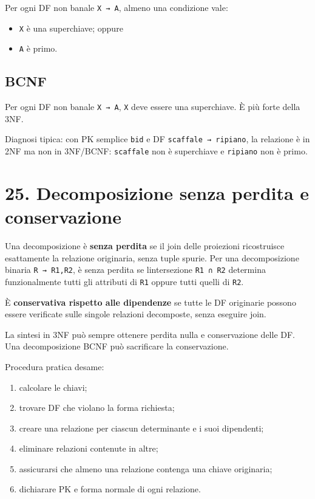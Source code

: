 \documentclass[
  10pt,
  a4paper,
]{article}
\providecommand{\tightlist}{%
  \setlength{\itemsep}{0pt}\setlength{\parskip}{0pt}}
\begin{document}
Per ogni DF non banale \texttt{X\ →\ A}, almeno una condizione vale:

\begin{itemize}
\tightlist
\item
  \texttt{X} è una superchiave; oppure
\item
  \texttt{A} è primo.
\end{itemize}

\subsection{BCNF}\label{bcnf}

Per ogni DF non banale \texttt{X\ →\ A}, \texttt{X} deve essere una
superchiave. È più forte della 3NF.

Diagnosi tipica: con PK semplice \texttt{bid} e DF
\texttt{scaffale\ →\ ripiano}, la relazione è in 2NF ma non in 3NF/BCNF:
\texttt{scaffale} non è superchiave e \texttt{ripiano} non è primo.

\section{25. Decomposizione senza perdita e
conservazione}\label{25-decomposizione-senza-perdita-e-conservazione}

Una decomposizione è \textbf{senza perdita} se il join delle proiezioni
ricostruisce esattamente la relazione originaria, senza tuple spurie.
Per una decomposizione binaria \texttt{R\ →\ R1,R2}, è senza perdita se
l\textquotesingle intersezione \texttt{R1\ ∩\ R2} determina
funzionalmente tutti gli attributi di \texttt{R1} oppure tutti quelli di
\texttt{R2}.

È \textbf{conservativa rispetto alle dipendenze} se tutte le DF
originarie possono essere verificate sulle singole relazioni decomposte,
senza eseguire join.

La sintesi in 3NF può sempre ottenere perdita nulla e conservazione
delle DF. Una decomposizione BCNF può sacrificare la conservazione.

Procedura pratica d\textquotesingle esame:

\begin{enumerate}
\def\labelenumi{\arabic{enumi}.}
\tightlist
\item
  calcolare le chiavi;
\item
  trovare DF che violano la forma richiesta;
\item
  creare una relazione per ciascun determinante e i suoi dipendenti;
\item
  eliminare relazioni contenute in altre;
\item
  assicurarsi che almeno una relazione contenga una chiave originaria;
\item
  dichiarare PK e forma normale di ogni relazione.
\end{enumerate}
\end{document}
